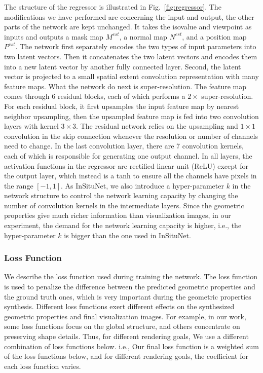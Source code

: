\documentclass[journal]{vgtc}                %
\begin{document}
The structure of the regressor is illustrated in Fig.~\ref{fig:regressor}. The modifications we have performed are concerning the input and output, the other parts of the network are kept unchanged. It takes the isovalue and viewpoint as inputs and outputs a mask map $M^{est}$, a normal map $N^{est}$, and a position map $P^{est}$. The network first separately encodes the two types of input parameters into two latent vectors. Then it concatenates the two latent vectors and encodes them into a new latent vector by another fully connected layer. Second, the latent vector is projected to a small spatial extent convolution representation with many feature maps. What the network do next is super-resolution. The feature map comes through $6$ residual blocks, each of which performs a $2 \times$ super-resolution. For each residual block, it first upsamples the input feature map by nearest neighbor upsampling, then the upsampled feature map is fed into two convolution layers with kernel $3 \times 3$. The residual network relies on the upsampling and $1 \times 1$ convolution in the skip connection whenever the resolution or number of channels need to change. In the last convolution layer, there are 7 convolution kernels, each of which is responsible for generating one output channel. In all layers, the activation functions in the regressor are rectified linear unit (ReLU) except for the output layer, which instead is a tanh to ensure all the channels have pixels in the range $[-1, 1]$.
As InSituNet, we also introduce a hyper-parameter $k$ in the network structure to control the network learning capacity by changing the number of convolution kernels in the intermediate layers. Since the geometric properties give much richer information than visualization images, in our experiment, the demand for the network learning capacity is higher, i.e., the hyper-parameter $k$ is bigger than the one used in InSituNet. 

\subsubsection{Loss Function}

We describe the loss function used during training the network. The loss function is used to penalize the difference between the predicted geometric properties and the ground truth ones, which is very important during the geometric properties synthesis.  Different loss functions exert different effects on the synthesized geometric properties and final visualization images.  For example, in our work, some loss functions focus on the global structure, and others concentrate on preserving shape details. Thus, for different rendering goals, We use a different combination of loss functions below. i.e., Our final loss function is a weighted sum of the loss functions below, and for different rendering goals, the coefficient for each loss function varies.    
\end{document}
